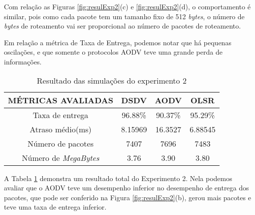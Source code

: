 Com rela\c{c}\~ao as Figuras \ref{fig:resulExp2}(c) e \ref{fig:resulExp2}(d), o comportamento \'e similar, pois como cada pacote tem um tamanho fixo de 512 \textit{bytes}, o n\'umero de \textit{bytes} de roteamento vai ser proporcional ao n\'umero de pacotes de roteamento.

Em rela\c{c}\~ao a m\'etrica de Taxa de Entrega, podemos notar que h\'a pequenas oscila\c{c}\~oes, e que somente o protocolos AODV teve uma grande perda de informa\c{c}\~oes.

\begin{table}[H]
	\centering
	\caption{Resultado das simula\c{c}\~oes do experimento 2}
	\begin{tabular}{ | c | c | c | c | }
		\hline
		M\'ETRICAS AVALIADAS & DSDV & AODV & OLSR \\ \hline
		Taxa de entrega & 96.88\% & 90.37\% & 95.29\%  \\ \hline
		Atraso m\'edio(ms) & 8.15969 & 16.3527 & 6.88545  \\ \hline
		N\'umero de pacotes & 7407 & 7696 & 7483  \\ \hline
		N\'umero de \textit{MegaBytes} & 3.76 & 3.90 & 3.80  \\ \hline
	\end{tabular}
	\label{tabExp2Result}
\end{table}

A Tabela \ref{tabExp2Result} demonstra um resultado total do Experimento 2. Nela podemos avaliar que o AODV teve um desempenho inferior no desempenho de entrega dos pacotes, que pode ser conferido na Figura \ref{fig:resulExp2}(b), gerou mais pacotes e teve uma taxa de entrega inferior.
